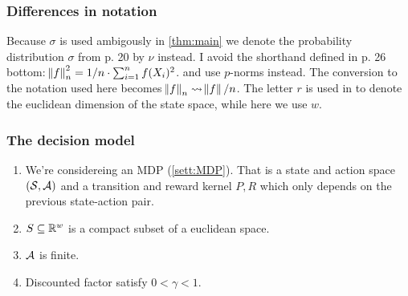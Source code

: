 

\subsubsection{Differences in notation}

Because $\sigma$ is used ambigously in \cref{thm:main}
we denote the probability distribution $\sigma$
from  p. 20 by $\nu$ instead.
I avoid the shorthand defined in
 p. 26 bottom:
$\norm{f}_n^2 = 1/n \cdot \sum_{i=1}^n f(X_i)^2$.
and use $p$-norms instead.
The conversion to the notation used here becomes
$\norm{f}_n \leadsto \norm{f}/n$.
The letter $r$ is used in  to denote the euclidean dimension of
the state space, while here we use $w$.

\subsubsection{The decision model}

\begin{sett}[Fan et al.]
  \leavevmode
  \begin{enumerate}
    \item We're considereing an MDP (\cref{sett:MDP}).
      That is a state and action space
      $(\mathcal{S}, \mathcal{A})$ and a transition and reward kernel $P, R$
      which only depends on the previous state-action pair.
    \item $S \subseteq \mathbb{R}^w$ is a compact subset of a euclidean space.
    \item $\mathcal{A}$ is finite.
    \item Discounted factor satisfy $0 < \gamma < 1$.
  \end{enumerate}
  \label{sett:Fan}
\end{sett}



